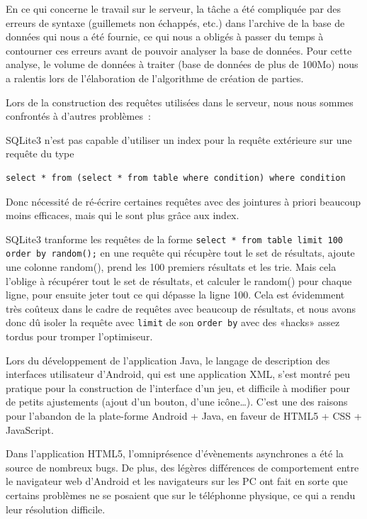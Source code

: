 \documentclass[a4paper,11pt,french]{article}
\def\android{Android\texttrademark{}}
\begin{document}
En ce qui concerne le travail sur le serveur, la tâche a été compliquée par des erreurs de syntaxe (guillemets non échappés, etc.) dans
l'archive de la base de données qui nous a été fournie, ce qui nous a obligés à passer du temps à contourner ces erreurs avant de pouvoir
analyser la base de données. Pour cette analyse, le volume de données à traiter (base de données de plus de 100Mo) nous a ralentis lors de
l'élaboration de l'algorithme de création de parties.

Lors de la construction des requêtes utilisées dans le serveur, nous nous sommes confrontés à d'autres problèmes~:

SQLite3 n'est pas capable d'utiliser un index pour la requête extérieure sur une requête du type
\begin{verbatim}
select * from (select * from table where condition) where condition
\end{verbatim}
Donc nécessité de ré-écrire certaines requêtes avec des jointures à priori beaucoup moins efficaces, mais qui le sont plus grâce aux index.

SQLite3 tranforme les requêtes de la forme \verb!select * from table limit 100 order by random();! en une requête qui récupère tout le set
de résultats, ajoute une colonne random(), prend les 100 premiers résultats et les trie. Mais cela l'oblige à récupérer tout le set de
résultats, et calculer le random() pour chaque ligne, pour ensuite jeter tout ce qui dépasse la ligne 100. Cela est évidemment très coûteux
dans le cadre de requêtes avec beaucoup de résultats, et nous avons donc dû isoler la requête avec \verb!limit! de son \verb!order by! avec
des «hacks» assez tordus pour tromper l'optimiseur.

Lors du développement de l'application Java, le langage de description des interfaces utilisateur d'\android{}, qui est une application XML,
s'est montré peu pratique pour la construction de l'interface d'un jeu, et difficile à modifier pour de petits ajustements (ajout d'un
bouton, d'une icône…). C'est une des raisons pour l'abandon de la plate-forme \android{} + Java, en faveur de HTML5 + CSS + JavaScript.

Dans l'application HTML5, l'omniprésence d'évènements asynchrones a été la source de nombreux bugs. De plus, des légères différences de
comportement entre le navigateur web d'\android{} et les navigateurs sur les PC ont fait en sorte que certains problèmes ne se posaient que
sur le téléphonne physique, ce qui a rendu leur résolution difficile.
\end{document}
